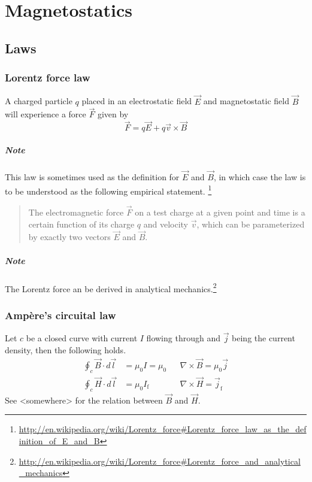 \chapter{Magnetostatics}

\section{Laws}



\subsection{Lorentz force law}

A charged particle $q$ placed in an electrostatic field $\vec{E}$ and
magnetostatic field $\vec{B}$ will experience a force $\vec{F}$ given
by
\begin{equation*}
  \vec{F} = q\vec{E} + q\vec{v}\times\vec{B}
\end{equation*}

\paragraph{Note} This law is sometimes used as the definition for
$\vec{E}$ and $\vec{B}$, in which case the law is to be understood as
the following empirical statement.
\footnote{\url{http://en.wikipedia.org/wiki/Lorentz_force\#Lorentz_force_law_as_the_definition_of_E_and_B}}
\begin{quote}
  The electromagnetic force $\vec{F}$ on a test charge at a given
  point and time is a certain function of its charge $q$ and velocity
  $\vec{v}$, which can be parameterized by exactly two vectors
  $\vec{E}$ and $\vec{B}$.
\end{quote}

\paragraph{Note} The Lorentz force an be derived in analytical mechanics.\footnote{\url{http://en.wikipedia.org/wiki/Lorentz_force\#Lorentz_force_and_analytical_mechanics}}



\subsection{Ampère's circuital law}

Let $c$ be a closed curve with current $I$ flowing through and
$\vec{j}$ being the current density, then the following holds.
\begin{align*}
  \oint_c \vec{B}\cdot d\vec{l} &= \mu_0I = \mu_0 && \nabla\times\vec{B} = \mu_0\vec{j} \\
  \oint_c \vec{H}\cdot d\vec{l} &= \mu_0I_\text{f} && \nabla\times\vec{H} = \vec{j}_\text{f}
\end{align*}
See <somewhere> for the relation between $\vec{B}$ and $\vec{H}$.



